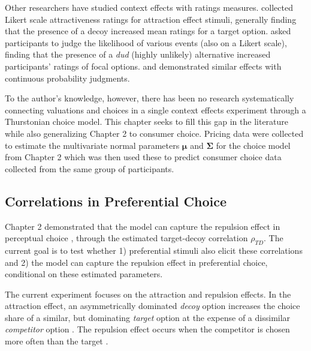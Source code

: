 Other researchers have studied context effects with ratings measures. \textcite{wedellUsingJudgmentsUnderstand} collected Likert scale attractiveness ratings for attraction effect stimuli, generally finding that the presence of a decoy increased mean ratings for a target option. \textcite{windschitl2004dud} asked participants to judge the likelihood of various events (also on a Likert scale), finding that the presence of a \textit{dud} (highly unlikely) alternative increased participants' ratings of focal options. \textcite{caiWhenAlternativeHypotheses2023} and \textcite{fang2024context} demonstrated similar effects with continuous probability judgments.

To the author's knowledge, however, there has been no research systematically connecting valuations and choices in a single context effects experiment through a Thurstonian choice model. This chapter seeks to fill this gap in the literature while also generalizing Chapter 2 to consumer choice. Pricing data were collected to estimate the multivariate normal parameters $\boldsymbol{\mu}$ and $\boldsymbol{\Sigma}$ for the choice model from Chapter 2 which was then used these to predict consumer choice data collected from the same group of participants.

\subsection{Correlations in Preferential Choice}
Chapter 2 demonstrated that the model can capture the repulsion effect in perceptual choice \parencite{spektorWhenGoodLooks2018b}, through the estimated target-decoy correlation $\rho_{TD}$. The current goal is to test whether 1) preferential stimuli also elicit these correlations and 2) the model can capture the repulsion effect in preferential choice, conditional on these estimated parameters. 

The current experiment focuses on the attraction and repulsion effects. In the attraction effect, an asymmetrically dominated \textit{decoy} option increases the choice share of a similar, but dominating \textit{target} option at the expense of a dissimilar \textit{competitor} option \parencite{huberAddingAsymmetricallyDominated1982d}. The repulsion effect occurs when the competitor is chosen more often than the target \parencite{frederick2008attraction}. 

